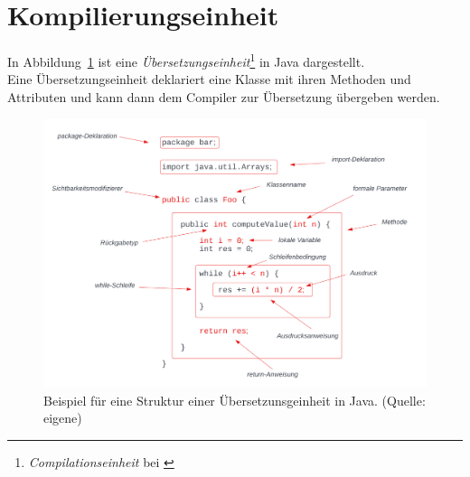 \section{Kompilierungseinheit}

In Abbildung~\ref{fig:compilationunit} ist eine \textit{Übersetzungseinheit}\footnote{
    \textit{Compilationseinheit} bei \cite[100]{Ull23}
} in Java dargestellt.\\
Eine Übersetzungseinheit deklariert eine Klasse mit ihren Methoden und Attributen und kann dann dem Compiler zur Übersetzung übergeben werden.

\begin{figure}
    \begin{center}
        \includegraphics[scale=0.35]{chapters/Grundlagen/img/compilationunit}
        \caption{Beispiel für eine Struktur einer Übersetzunsgeinheit in Java. (Quelle: eigene)}
        \label{fig:compilationunit}
    \end{center}
\end{figure}